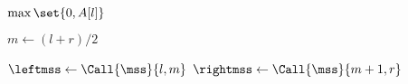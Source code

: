 
\begin{algorithm}[H]
  \begin{algorithmic}[1]
        \State {}
      \EndIf
      
      \hStatex
        \State \Return $\max \set{0, A[l]}$
      \EndIf

      \hStatex
      \State $m \gets (l + r)/2$

      \hStatex
      \State $\leftmss \gets \Call{\mss}{l, m}$
      \State $\rightmss \gets \Call{\mss}{m+1, r}$

  \end{algorithmic}
\end{algorithm}